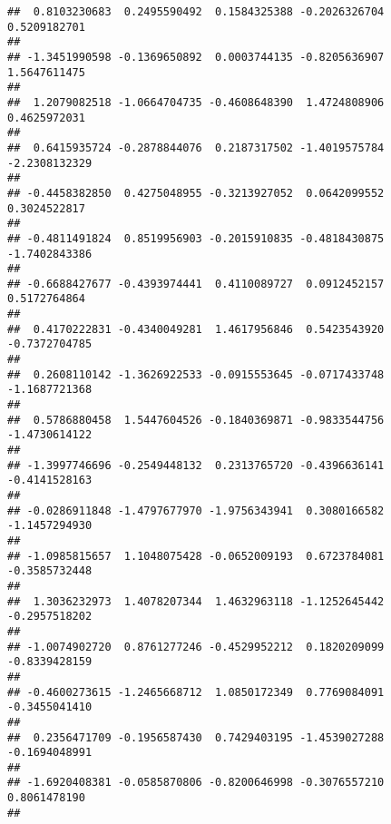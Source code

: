 \documentclass[]{article}
\begin{document}
\begin{verbatim}
##  0.8103230683  0.2495590492  0.1584325388 -0.2026326704  0.5209182701 
##                                                                       
## -1.3451990598 -0.1369650892  0.0003744135 -0.8205636907  1.5647611475 
##                                                                       
##  1.2079082518 -1.0664704735 -0.4608648390  1.4724808906  0.4625972031 
##                                                                       
##  0.6415935724 -0.2878844076  0.2187317502 -1.4019575784 -2.2308132329 
##                                                                       
## -0.4458382850  0.4275048955 -0.3213927052  0.0642099552  0.3024522817 
##                                                                       
## -0.4811491824  0.8519956903 -0.2015910835 -0.4818430875 -1.7402843386 
##                                                                       
## -0.6688427677 -0.4393974441  0.4110089727  0.0912452157  0.5172764864 
##                                                                       
##  0.4170222831 -0.4340049281  1.4617956846  0.5423543920 -0.7372704785 
##                                                                       
##  0.2608110142 -1.3626922533 -0.0915553645 -0.0717433748 -1.1687721368 
##                                                                       
##  0.5786880458  1.5447604526 -0.1840369871 -0.9833544756 -1.4730614122 
##                                                                       
## -1.3997746696 -0.2549448132  0.2313765720 -0.4396636141 -0.4141528163 
##                                                                       
## -0.0286911848 -1.4797677970 -1.9756343941  0.3080166582 -1.1457294930 
##                                                                       
## -1.0985815657  1.1048075428 -0.0652009193  0.6723784081 -0.3585732448 
##                                                                       
##  1.3036232973  1.4078207344  1.4632963118 -1.1252645442 -0.2957518202 
##                                                                       
## -1.0074902720  0.8761277246 -0.4529952212  0.1820209099 -0.8339428159 
##                                                                       
## -0.4600273615 -1.2465668712  1.0850172349  0.7769084091 -0.3455041410 
##                                                                       
##  0.2356471709 -0.1956587430  0.7429403195 -1.4539027288 -0.1694048991 
##                                                                       
## -1.6920408381 -0.0585870806 -0.8200646998 -0.3076557210  0.8061478190 
##                                                                       

\end{verbatim}
\end{document}
